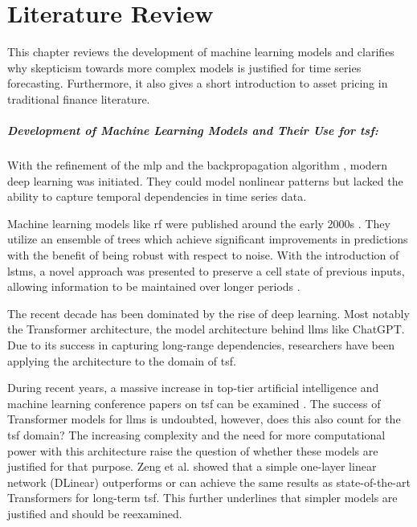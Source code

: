 \documentclass[12pt,twoside=false,a4paper,parskip]{scrbook}
\begin{document}
\chapter{Literature Review}
\label{ch:literature_review}
This chapter reviews the development of machine learning models and clarifies why skepticism towards more complex models is justified for time series forecasting. 
Furthermore, it also gives a short introduction to asset pricing in traditional finance literature.

\paragraph{Development of Machine Learning Models and Their Use for \gls{tsf}:}
With the refinement of the \gls{mlp} and the backpropagation algorithm \cite{rumelhart1986learning}, modern deep learning was initiated. They could model nonlinear patterns but lacked the ability to capture temporal dependencies in time series data.

Machine learning models like \gls{rf} were published around the early 2000s \cite{breiman_random_2001}. They utilize an ensemble of trees which achieve significant improvements in predictions with the benefit of being robust with respect to noise. With the introduction of \glspl{lstm}, a novel approach was presented to preserve a cell state of previous inputs, allowing information to be maintained over longer periods \cite{hochreiter_lstm}.

The recent decade has been dominated by the rise of deep learning. Most notably the Transformer architecture, the model architecture behind \glspl{llm} like ChatGPT. Due to its success in capturing long-range dependencies, researchers have been applying the architecture to the domain of \gls{tsf}.

During recent years, a massive increase in top-tier artificial intelligence and machine learning conference papers on \gls{tsf} can be examined \cite[p. 4]{Kim2025Survey}. The success of Transformer models for \glspl{llm} is undoubted, however, does this also count for the \gls{tsf} domain? The increasing complexity and the need for more computational power with this architecture raise the question of whether these models are justified for that purpose. Zeng et al. \cite{zeng2022transformerseffectivetimeseries} showed that a simple one-layer linear network (DLinear) outperforms or can achieve the same results as state-of-the-art Transformers for long-term \gls{tsf}. This further underlines that simpler models are justified and should be reexamined.
\end{document}
